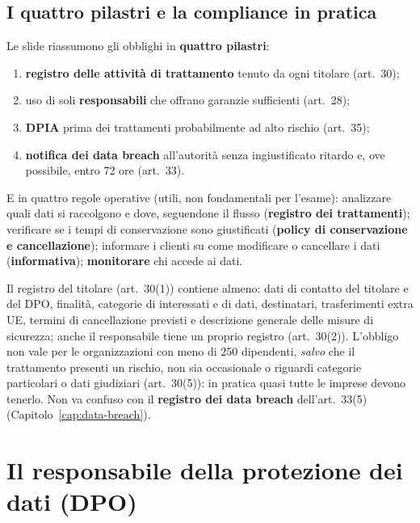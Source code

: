 \subsection{I quattro pilastri e la compliance in pratica}
Le slide riassumono gli obblighi in \textbf{quattro pilastri}:
\begin{enumerate}
  \item \textbf{registro delle attività di trattamento} tenuto da ogni titolare (art.~30);
  \item uso di soli \textbf{responsabili} che offrano garanzie sufficienti (art.~28);
  \item \textbf{DPIA} prima dei trattamenti probabilmente ad alto rischio (art.~35);
  \item \textbf{notifica dei data breach} all'autorità senza ingiustificato ritardo e, ove possibile,
    entro 72 ore (art.~33).
\end{enumerate}
E in quattro regole operative (utili, non fondamentali per l'esame): analizzare quali dati si raccolgono
e dove, seguendone il flusso (\textbf{registro dei trattamenti}); verificare se i tempi di conservazione
sono giustificati (\textbf{policy di conservazione e cancellazione}); informare i clienti su come
modificare o cancellare i dati (\textbf{informativa}); \textbf{monitorare} chi accede ai dati.

\begin{integrazione}
Il registro del titolare (art.~30(1)) contiene almeno: dati di contatto del titolare e del DPO, finalità,
categorie di interessati e di dati, destinatari, trasferimenti extra UE, termini di cancellazione previsti
e descrizione generale delle misure di sicurezza; anche il responsabile tiene un proprio registro
(art.~30(2)). L'obbligo non vale per le organizzazioni con meno di 250 dipendenti, \emph{salvo} che il
trattamento presenti un rischio, non sia occasionale o riguardi categorie particolari o dati giudiziari
(art.~30(5)): in pratica quasi tutte le imprese devono tenerlo. Non va confuso con il
\textbf{registro dei data breach} dell'art.~33(5) (Capitolo~\ref{cap:data-breach}).
\end{integrazione}

\section{Il responsabile della protezione dei dati (DPO)}
\label{sec:gdpr-dpo}

